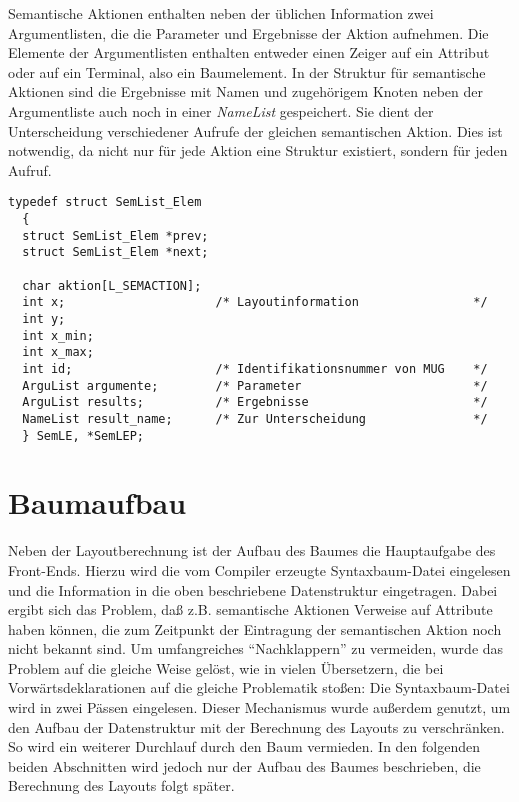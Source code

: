 Semantische Aktionen enthalten neben der \"ublichen Information zwei Argumentlisten, die die Parameter und Ergebnisse der Aktion aufnehmen. Die Elemente
der Argumentlisten enthalten entweder einen Zeiger auf ein Attribut oder auf ein Terminal, also ein Baumelement. In der Struktur f\"ur
semantische Aktionen sind die Ergebnisse mit Namen und zugeh\"origem Knoten neben der Argumentliste auch noch in einer {\it NameList} gespeichert. Sie
dient der Unterscheidung verschiedener Aufrufe der gleichen semantischen Aktion. Dies ist notwendig, da nicht nur f\"ur jede Aktion eine Struktur
existiert, sondern f\"ur jeden Aufruf.

\begin{small}\begin{verbatim}
typedef struct SemList_Elem
  {
  struct SemList_Elem *prev;
  struct SemList_Elem *next;

  char aktion[L_SEMACTION];
  int x;                     /* Layoutinformation                */
  int y;
  int x_min;
  int x_max;
  int id;                    /* Identifikationsnummer von MUG    */
  ArguList argumente;        /* Parameter                        */
  ArguList results;          /* Ergebnisse                       */
  NameList result_name;      /* Zur Unterscheidung               */
  } SemLE, *SemLEP;
\end{verbatim}\end{small}


\section{Baumaufbau}

Neben der Layoutberechnung ist der Aufbau des Baumes die Hauptaufgabe des Front-Ends. Hierzu wird die vom Compiler erzeugte Syntaxbaum-Datei
eingelesen und die Information in die oben beschriebene Datenstruktur eingetragen. Dabei ergibt sich das Problem, da\ss{} z.B. semantische Aktionen Verweise
auf Attribute haben k\"onnen, die zum Zeitpunkt der Eintragung der semantischen Aktion noch nicht bekannt sind. Um umfangreiches "`Nachklappern"' zu
vermeiden, wurde das Problem auf die gleiche Weise gel\"ost, wie in vielen \"Ubersetzern, die bei Vorw\"artsdeklarationen auf die gleiche Problematik
sto\ss{}en: Die Syntaxbaum-Datei wird in zwei P\"assen eingelesen.
Dieser Mechanismus wurde au\ss{}erdem genutzt, um den Aufbau der Datenstruktur mit der Berechnung des Layouts zu verschr\"anken. So wird ein weiterer Durchlauf
durch den Baum vermieden. In den folgenden beiden Abschnitten wird jedoch nur der Aufbau des Baumes beschrieben, die Berechnung des Layouts folgt sp\"ater.

